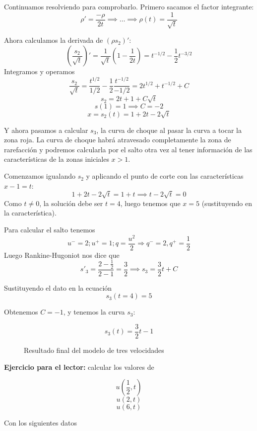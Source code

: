 \begin{example}
			Continuamos resolviendo para comprobarlo. Primero sacamos el factor integrante: \[ \rho' = \frac{-\rho}{2t} \implies … \implies \rho(t) = \frac{1}{\sqrt{t}} \]

			Ahora calculamos la derivada de $(ρs_2)'$: \
			\[ \left(\frac{s_2}{\sqrt{t}}\right)' = \frac{1}{\sqrt{t}} \left( 1 - \frac{1}{2t}\right) = t^{-1/2} - \frac{1}{2} t^{-3/2} \]
			Integramos y operamos
			$$\frac{s_2}{\sqrt{t}} = \frac{t^{1/2}}{1/2} - \frac{1}{2} \frac{t^{-1/2}}{-1/2} = 2t^{1/2} + t^{-1/2} + C$$
			$$ s_2 = 2t + 1 + C \sqrt{t} $$
			$$ s(1) = 1 \implies C = -2 $$
			$$ x = s_2 (t) = 1 + 2t - 2 \sqrt{t} $$

			Y ahora pasamos a calcular $s_3$, la curva de choque al pasar la curva a tocar la zona roja. La curva de choque habrá atravesado completamente la zona de rarefacción y podremos calcularla por el salto otra vez al tener información de las características de la zonas iniciales $x>1$.

			Comenzamos igualando $s_2$ y aplicando el punto de corte con las características $x-1=t$:
			$$ 1+2t - 2 \sqrt{t} = 1 + t \implies t- 2 \sqrt{t} = 0$$
			Como $t\neq 0$, la solución debe ser $t=4$, luego tenemos que $x=5$ (sustituyendo en la característica).

			Para calcular el salto tenemos
			$$u^{-} = 2 ; u^{+} = 1; q = \frac{u^2}{2} \Rightarrow q^{-} = 2, q^{+} = \frac{1}{2}$$
			Luego Rankine-Hugoniot nos dice que
			$$s'_3 = \frac{2 - \frac{1}{2}}{2 - 1} = \frac{3}{2} \implies s_3 = \frac{3}{2} t + C$$

			Sustituyendo el dato en la ecuación
			$$s_3 (t = 4) = 5$$

			Obtenemos $C = -1$, y tenemos la curva $s_3$:

			$$s_3(t) = \frac{3}{2} t - 1$$


			\begin{figure}[hbtp]
				\centering
				\caption{Resultado final del modelo de tres velocidades}
				\label{fig:ModeloTresVelocidades}
			\end{figure}



			\textbf{Ejercicio para el lector:} calcular los valores de

			$$u(\frac{1}{2},t)$$
			$$u(2,t)$$
			$$u(6,t)$$


		\end{example}

		\obs Con los siguientes datos

